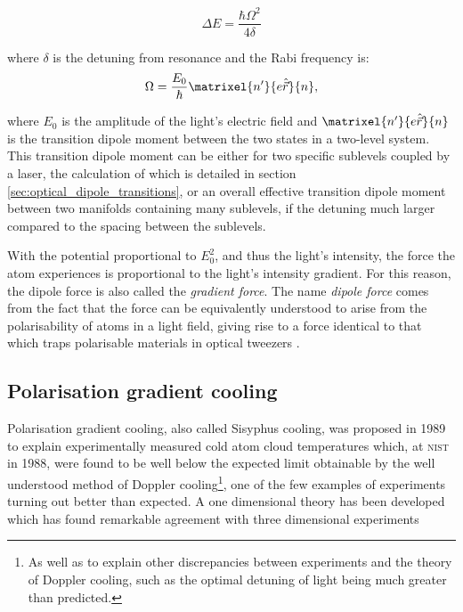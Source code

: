 \begin{equation}
\Delta E = \frac{\hbar\Omega^2}{4\delta}
\end{equation}

where $\delta$ is the detuning from resonance and the Rabi frequency is:
\begin{equation}
\Omega=\frac{E_0}\hbar\matrixel{n^\prime}{e\hat{\vec r}}{n},
\end{equation}

where $E_0$ is the amplitude of the light's electric field and  $\matrixel{n^\prime}{e\hat{\vec r}}{n}$ is the transition dipole moment between the two states in a two-level system. This transition dipole moment can be either for two specific sublevels coupled by a laser, the calculation of which is detailed in section \ref{sec:optical_dipole_transitions}, or an overall effective transition dipole moment between two manifolds containing many sublevels, if the detuning much larger compared to the spacing between the sublevels.

With the potential proportional to $E_0^2$, and thus the light's intensity, the force the atom experiences is proportional to the light's intensity gradient. For this reason, the dipole force is also called the \emph{gradient force}. The name \emph{dipole force} comes from the fact that the force can be equivalently understood to arise from the polarisability of atoms in a light field, giving rise to a force identical to that which traps polarisable materials in optical tweezers \cite{ashkin_acceleration_1970}.

\subsection{Polarisation gradient cooling}

Polarisation gradient cooling, also called Sisyphus cooling, was proposed in 1989 \cite{dalibard_laser_1989, ungar_optical_1989} to explain experimentally measured cold atom cloud temperatures \cite{lett_optical_1989} which, at \textsc{nist} in 1988, were found to be well below the expected limit obtainable by the well understood method of Doppler cooling\footnote{As well as to explain other discrepancies between experiments and the theory of Doppler cooling, such as the optimal detuning of light being much greater than predicted.}, one of the few examples of experiments turning out better than expected. A one dimensional theory has been developed \cite{dalibard_laser_1989} which has found remarkable agreement with three dimensional experiments \cite{salomon_laser_1990}

